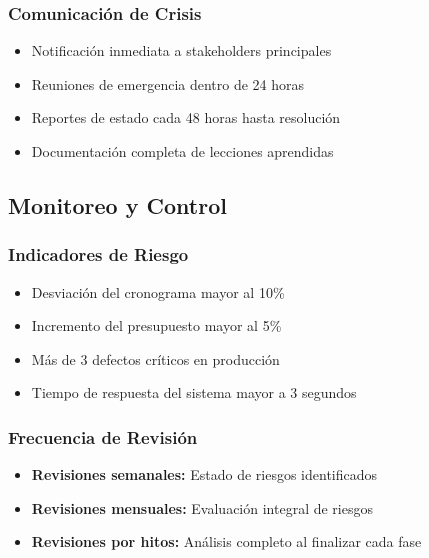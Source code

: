 \subsubsection{Comunicación de Crisis}
\begin{itemize}
    \item Notificación inmediata a stakeholders principales
    \item Reuniones de emergencia dentro de 24 horas
    \item Reportes de estado cada 48 horas hasta resolución
    \item Documentación completa de lecciones aprendidas
\end{itemize}

\subsection{Monitoreo y Control}

\subsubsection{Indicadores de Riesgo}
\begin{itemize}
    \item Desviación del cronograma mayor al 10\%
    \item Incremento del presupuesto mayor al 5\%
    \item Más de 3 defectos críticos en producción
    \item Tiempo de respuesta del sistema mayor a 3 segundos
\end{itemize}

\subsubsection{Frecuencia de Revisión}
\begin{itemize}
    \item \textbf{Revisiones semanales:} Estado de riesgos identificados
    \item \textbf{Revisiones mensuales:} Evaluación integral de riesgos
    \item \textbf{Revisiones por hitos:} Análisis completo al finalizar cada fase
\end{itemize}